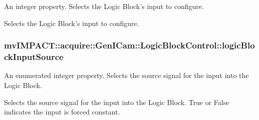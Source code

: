 An integer property. Selects the Logic Block's input to configure. 

Selects the Logic Block's input to configure. \hypertarget{classmv_i_m_p_a_c_t_1_1acquire_1_1_gen_i_cam_1_1_logic_block_control_a3217fe86aec15819297079c277a0c7b0}{
\subsubsection[{logic\+Block\+Input\+Source}]{ mv\+I\+M\+P\+A\+C\+T\+::acquire\+::\+Gen\+I\+Cam\+::\+Logic\+Block\+Control\+::logic\+Block\+Input\+Source}}\label{classmv_i_m_p_a_c_t_1_1acquire_1_1_gen_i_cam_1_1_logic_block_control_a3217fe86aec15819297079c277a0c7b0}


An enumerated integer property. Selects the source signal for the input into the Logic Block. 

Selects the source signal for the input into the Logic Block. True or False indicates the input is forced constant.

